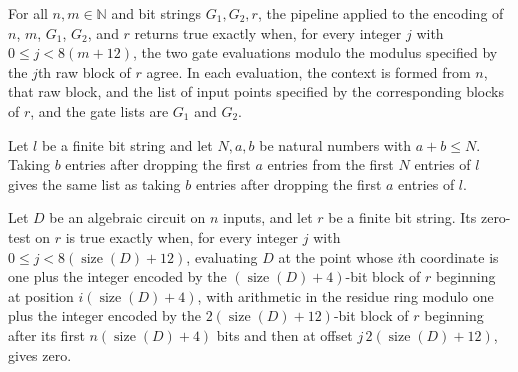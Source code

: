 \begin{theorem}
\label{Randomized.PIT.pipe_eq}
\leanok
{}
For all $n,m\in\mathbb{N}$ and bit strings $G_1,G_2,r$, the pipeline applied to the
encoding of $n$, $m$, $G_1$, $G_2$, and $r$ returns true exactly when, for every integer
$j$ with $0\le j<8(m+12)$, the two gate evaluations modulo the modulus specified by the
$j$th raw block of $r$ agree. In each evaluation, the context is formed from $n$, that
raw block, and the list of input points specified by the corresponding blocks of $r$,
and the gate lists are $G_1$ and $G_2$.
\end{theorem}

\begin{theorem}
\label{Randomized.PIT.take_drop_take}
\leanok
{}
Let $l$ be a finite bit string and let $N,a,b$ be natural numbers with $a+b\le N$.
Taking $b$ entries after dropping the first $a$ entries from the first $N$ entries of
$l$ gives the same list as taking $b$ entries after dropping the first $a$ entries of
$l$.
\end{theorem}

\begin{theorem}
\label{Randomized.PIT.zeroTest_eq}
\leanok
{}
Let $D$ be an algebraic circuit on $n$ inputs, and let $r$ be a finite bit string. Its
zero-test on $r$ is true exactly when, for every integer $j$ with $0 \le j <
8(\operatorname{size}(D)+12)$, evaluating $D$ at the point whose $i$th coordinate is one
plus the integer encoded by the $(\operatorname{size}(D)+4)$-bit block of $r$ beginning
at position $i(\operatorname{size}(D)+4)$, with arithmetic in the residue ring modulo
one plus the integer encoded by the $2(\operatorname{size}(D)+12)$-bit block of $r$
beginning after its first $n(\operatorname{size}(D)+4)$ bits and then at offset
$j\,2(\operatorname{size}(D)+12)$, gives zero.
\end{theorem}

